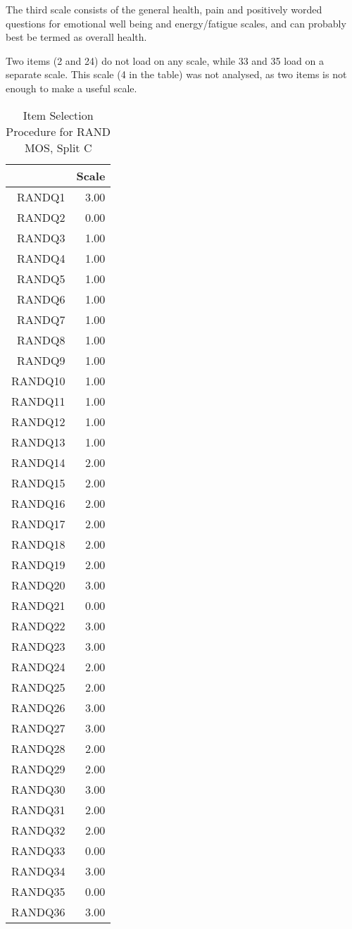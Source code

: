 \documentclass{article}
\begin{document}
The third scale consists of the general health, pain and positively worded questions for emotional well being and energy/fatigue scales, and can probably best be termed as overall health. 

Two items (2 and 24) do not load on any scale, while 33 and 35 load on a separate scale. This scale (4 in the table) was not analysed, as two items is not enough to make a useful scale. 


\begin{table}[ht]
\centering
\begin{tabular}{rr}
  \hline
 & Scale \\ 
  \hline
RANDQ1 & 3.00 \\ 
  RANDQ2 & 0.00 \\ 
  RANDQ3 & 1.00 \\ 
  RANDQ4 & 1.00 \\ 
  RANDQ5 & 1.00 \\ 
  RANDQ6 & 1.00 \\ 
  RANDQ7 & 1.00 \\ 
  RANDQ8 & 1.00 \\ 
  RANDQ9 & 1.00 \\ 
  RANDQ10 & 1.00 \\ 
  RANDQ11 & 1.00 \\ 
  RANDQ12 & 1.00 \\ 
  RANDQ13 & 1.00 \\ 
  RANDQ14 & 2.00 \\ 
  RANDQ15 & 2.00 \\ 
  RANDQ16 & 2.00 \\ 
  RANDQ17 & 2.00 \\ 
  RANDQ18 & 2.00 \\ 
  RANDQ19 & 2.00 \\ 
  RANDQ20 & 3.00 \\ 
  RANDQ21 & 0.00 \\ 
  RANDQ22 & 3.00 \\ 
  RANDQ23 & 3.00 \\ 
  RANDQ24 & 2.00 \\ 
  RANDQ25 & 2.00 \\ 
  RANDQ26 & 3.00 \\ 
  RANDQ27 & 3.00 \\ 
  RANDQ28 & 2.00 \\ 
  RANDQ29 & 2.00 \\ 
  RANDQ30 & 3.00 \\ 
  RANDQ31 & 2.00 \\ 
  RANDQ32 & 2.00 \\ 
  RANDQ33 & 0.00 \\ 
  RANDQ34 & 3.00 \\ 
  RANDQ35 & 0.00 \\ 
  RANDQ36 & 3.00 \\ 
   \hline
\end{tabular}
\caption{Item Selection Procedure for RAND MOS, Split C} 
\label{tab:rand2caisp}
\end{table}
\end{document}
